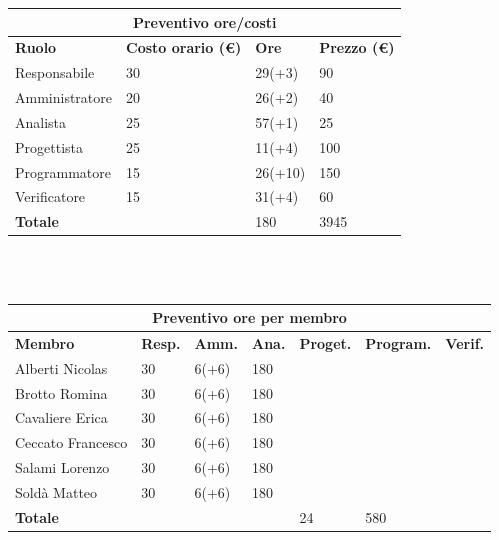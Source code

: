 \documentclass[a4paper, 12pt]{article}
\begin{document}
\begin{center}
	\begin{tabularx}{\textwidth}{|X|X|X|X|}
		\hline
		\multicolumn{4}{|c|}{\textbf{Preventivo ore/costi}}                                      \\
		\hline
		\hline
		\textbf{Ruolo}  & \textbf{Costo orario (\euro)} & \textbf{Ore} & \textbf{Prezzo (\euro)} \\
		\hline
		Responsabile    & 30                            & 29(+3)       & 90                      \\
		\hline
		Amministratore  & 20                            & 26(+2)       & 40                       \\
		\hline
		Analista        & 25                            & 57(+1)       & 25                       \\
		\hline
		Progettista     & 25                            & 11(+4)       & 100                     \\
		\hline
		Programmatore   & 15                            & 26(+10)       & 150                     \\
		\hline
		Verificatore    & 15                            & 31(+4)       & 60                      \\
		\hline
		\hline
		\textbf{Totale} &                               & 180         & 3945                   \\
		\hline
	\end{tabularx}\\[8pt]
	\mbox{}\\
\end{center}

\begin{center}
	\begin{tabularx}{\textwidth}{|X|X|X|X|X|X|X|}
		\hline
		\multicolumn{7}{|c|}{\textbf{Preventivo ore per membro}}                                      \\
		\hline
		\hline
		\textbf{Membro}  & \textbf{Resp.} & \textbf{Amm.} & \textbf{Ana.} &
		\textbf{Proget.} & \textbf{Program.} & \textbf{Verif.} \\
		\hline
		Alberti Nicolas    	& 30 	& 6(+6)       & 180  & &  &                 \\
		\hline
		Brotto Romina    	& 30 	& 6(+6)       & 180  & &  &                 \\
		\hline
		Cavaliere Erica    	& 30 	& 6(+6)       & 180  & &  &                 \\
		\hline
		Ceccato Francesco    	& 30 	& 6(+6)       & 180  & &   &                \\
		\hline
		Salami Lorenzo    	& 30 	& 6(+6)       & 180  & &     &               \\
		\hline
		Soldà Matteo    	& 30 	& 6(+6)       & 180  & &   &                 \\
		\hline
		\hline
		\textbf{Totale} &    & & & 24           & 580      &               \\
		\hline
	\end{tabularx}\\[8pt]
	\mbox{}\\
\end{center}
\end{document}
